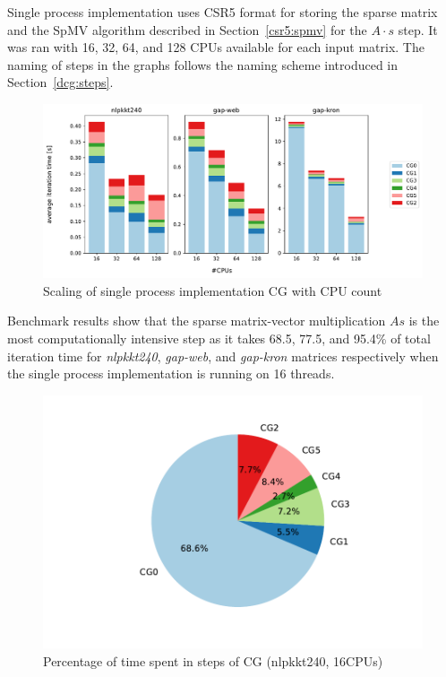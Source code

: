 \documentclass[thesis=M,english]{FITthesis}[2019/12/23]
\begin{document}
Single process implementation uses CSR5 format for storing the sparse matrix and the
SpMV algorithm  described in Section~\ref{csr5:spmv} for the \(A \cdot s\) step. It was ran
with 16, 32, 64, and 128 CPUs available for each input matrix. The naming of steps 
in the graphs follows the naming scheme introduced in Section~\ref{dcg:steps}.

\begin{figure}[htp]
    \centering
    \includegraphics[scale=0.5]{static/single_process.pdf}
    \caption{Scaling of single process implementation CG with CPU count}
\end{figure}

Benchmark results show that the sparse matrix-vector multiplication
\(As\) is the most computationally intensive step as it takes 68.5, 77.5, and 95.4\% of
total iteration time for \textit{nlpkkt240}, \textit{gap-web}, and \textit{gap-kron} 
matrices respectively when the single process implementation is running on 16 threads.


\begin{figure}[htp]
    \centering
    \includegraphics[scale=0.6]{static/cg_sp_nlpkkt240_16.pdf}
    \caption{Percentage of time spent in steps of CG (nlpkkt240, 16CPUs)}
\end{figure}
\end{document}
